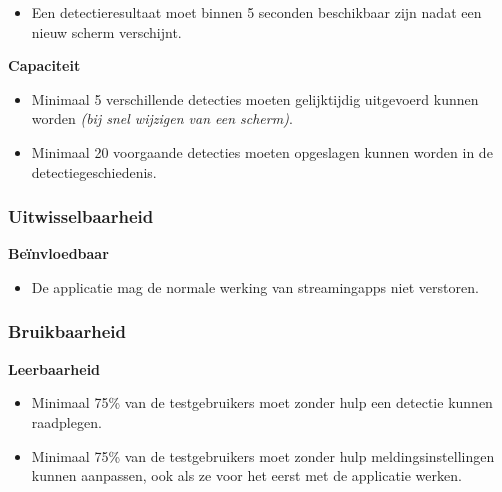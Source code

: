 \begin{itemize}
    \item Een detectieresultaat moet binnen 5 seconden beschikbaar zijn nadat een nieuw scherm verschijnt.
\end{itemize}

\vspace{0.5em}

\textcolor{customlightgray}{\hspace*{1.5em}\textbf{Capaciteit}}

\begin{itemize}
    \item \textcolor{customlightgray}{Minimaal 5 verschillende detecties moeten gelijktijdig uitgevoerd kunnen worden \textit{(bij snel wijzigen van een scherm)}.}
    \item \textcolor{customlightgray}{Minimaal 20 voorgaande detecties moeten opgeslagen kunnen worden in de detectiegeschiedenis.}
\end{itemize}

\vspace{1em}

\subsubsection{Uitwisselbaarheid}
\vspace{1em}

\hspace*{1.5em}\textbf{Beïnvloedbaar}

\begin{itemize}
    \item De applicatie mag de normale werking van streamingapps niet verstoren.
\end{itemize}

\vspace{1em}

\subsubsection{Bruikbaarheid}
\vspace{1em}

\hspace*{1.5em}\textbf{Leerbaarheid}

\begin{itemize}
    \item Minimaal 75\% van de testgebruikers moet zonder hulp een detectie kunnen raadplegen.
    \item Minimaal 75\% van de testgebruikers moet zonder hulp meldingsinstellingen kunnen aanpassen, ook als ze voor het eerst met de applicatie werken.
\end{itemize}


